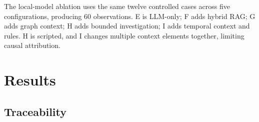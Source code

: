 \documentclass[
  11pt,
  a4paper,
]{report}
\begin{document}
The local-model ablation uses the same twelve controlled cases across
five configurations, producing 60 observations. E is LLM-only; F adds
hybrid RAG; G adds graph context; H adds bounded investigation; I adds
temporal context and rules. H is scripted, and I changes multiple
context elements together, limiting causal attribution.

\hypertarget{results}{%
\chapter{Results}\label{results}}

\hypertarget{traceability}{%
\section{Traceability}\label{traceability}}
\end{document}
